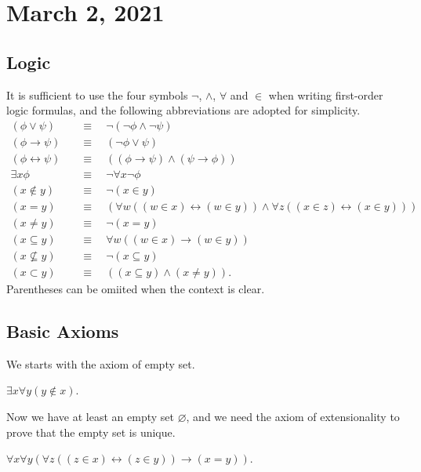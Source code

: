 \documentclass[11pt]{article}
\begin{document}
\section{March 2, 2021}
\subsection{Logic}
It is sufficient to use the four symbols $\neg$, $\wedge$, $\forall$ and $\in$ when writing first-order logic formulas, and the following abbreviations are adopted for simplicity.
\begin{align*}
  (\phi \vee \psi) \quad &\equiv \quad \neg (\neg \phi \wedge \neg \psi) \\
  (\phi \rightarrow \psi) \quad &\equiv \quad (\neg \phi \vee \psi) \\
  (\phi \leftrightarrow \psi) \quad &\equiv \quad ((\phi \rightarrow \psi) \wedge (\psi \rightarrow \phi)) \\
  \exists x \phi \quad &\equiv \quad \neg \forall x \neg \phi \\
  (x \notin y) \quad &\equiv \quad \neg (x \in y) \\
  (x = y) \quad &\equiv \quad (\forall w ((w \in x) \leftrightarrow (w \in y)) \wedge \forall z ((x \in z) \leftrightarrow (x \in y))) \\
  (x \neq y) \quad &\equiv \quad \neg (x = y) \\
  (x \subseteq y) \quad &\equiv \quad \forall w ((w \in x) \rightarrow (w \in y)) \\
  (x \not \subseteq y) \quad &\equiv \quad \neg (x \subseteq y) \\
  (x \subset y) \quad &\equiv \quad ((x \subseteq y) \wedge (x \neq y)).
\end{align*}
Parentheses can be omiited when the context is clear.

\subsection{Basic Axioms}
We starts with the axiom of empty set.

\begin{axiom}
  $\exists x \forall y (y \notin x)$.
\end{axiom}

Now we have at least an empty set $\varnothing$, and we need the axiom of extensionality to prove that the empty set is unique.

\begin{axiom}[Extensionality]
  $\forall x \forall y (\forall z ((z \in x) \leftrightarrow (z \in y)) \rightarrow (x = y))$.
\end{axiom}
\end{document}
